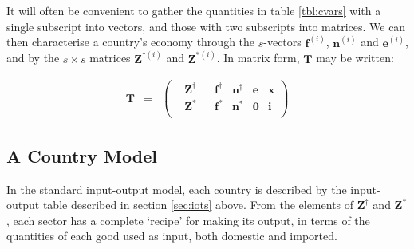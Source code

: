 \documentclass[a4paper]{article}
\begin{document}
\noindent It will often be convenient to gather the quantities in table \ref{tbl:cvars} with a single subscript into vectors, and those with two subscripts into matrices. 
We can then characterise a country's economy through the $s$-vectors $\boldsymbol{f}^{(i)}$, $\boldsymbol{n}^{(i)}$ and $\boldsymbol{e}^{(i)}$, and by the $s\times s$ matrices $\boldsymbol{Z}^{\dagger(i)}$ and $\boldsymbol{Z}^{*(i)}$.
In matrix form, $\boldsymbol{T}$ may be written:

\begin{equation}\label{eqn:Tvectorised}
\begin{array}{rcc}
\boldsymbol{T} & = & 
\left(
	\begin{array}{ccccccc}
 & \boldsymbol{Z}^{\dag} & & \boldsymbol{f}^\dag & \boldsymbol{n}^\dag & \boldsymbol{e} & \boldsymbol{x} \\
 & \boldsymbol{Z}^* & & \boldsymbol{f}^* & \boldsymbol{n}^* & \boldsymbol{0} & \boldsymbol{i} \\
	\end{array} 
\right)
\end{array}
\end{equation}

\subsection{A Country Model}\label{sec:countries}
In the standard input-output model, each country is described by the input-output table described in section \ref{sec:iots} above.
From the elements of $\boldsymbol{Z}^\dagger$ and $\boldsymbol{Z}^*$, each sector has a complete `recipe' for making its output, in terms of the quantities of each good used as input, both domestic and imported.
\end{document}
